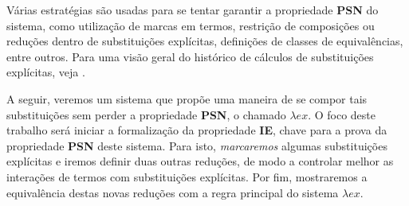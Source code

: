 Várias estratégias são usadas para se tentar garantir a propriedade \textbf{PSN}
do sistema, como utilização de marcas em termos, restrição de composições ou
reduções dentro de substituições explícitas, definições de classes de
equivalências, entre outros. Para uma visão geral do histórico de cálculos de
substituições explícitas, veja \cite{delia}.


A seguir, veremos um sistema que propõe uma maneira de se compor tais
substituições sem perder a propriedade \textbf{PSN}, o chamado $\lambda ex$. O
foco deste trabalho será iniciar a formalização da propriedade \textbf{IE},
chave para a prova da propriedade \textbf{PSN} deste sistema.  Para isto,
\emph{marcaremos} algumas substituições explícitas e iremos definir duas outras
reduções, de modo a controlar melhor as interações de termos com substituições
explícitas. Por fim, mostraremos a equivalência destas novas reduções com a
regra principal do sistema $\lambda ex$.



